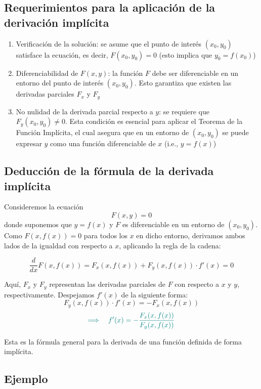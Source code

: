 \documentclass{article}
\begin{document}
\subsection*{Requerimientos para la aplicación de la derivación implícita}
\begin{enumerate}
    \item {\color{teal}Verificación de la solución:} se asume que el punto de interés \((x_0,y_0)\) satisface la ecuación, es decir, \(F(x_0,y_0) = 0\) (esto implica que \(y_0 = f(x_0)\))
    \item {\color{teal}Diferenciabilidad de \( F(x,y) \):} la función \( F \) debe ser diferenciable en un entorno del punto de interés \((x_0,y_0)\). Esto garantiza que existen las derivadas parciales \( F_x \) y \( F_y \)
    \item {\color{teal}No nulidad de la derivada parcial respecto a \( y \):} se requiere que \( F_y(x_0,y_0) \neq 0 \). Esta condición es esencial para aplicar el Teorema de la Función Implícita, el cual asegura que en un entorno de \((x_0,y_0)\) se puede expresar \( y \) como una función diferenciable de \( x \) (i.e., \( y = f(x) \))
\end{enumerate}

\subsection*{Deducción de la fórmula de la derivada implícita}

Consideremos la ecuación
\[
F(x,y) = 0
\]
donde suponemos que \( y = f(x) \) y \( F \) es diferenciable en un entorno de \((x_0,y_0)\). Como \( F(x,f(x)) = 0 \) para todos los \( x \) en dicho entorno, derivamos ambos lados de la igualdad con respecto a \( x \), aplicando la regla de la cadena:

\[
\frac{d}{dx}F(x,f(x)) = F_x(x,f(x)) + F_y(x,f(x)) \cdot f'(x) = 0
\]

Aquí, \( F_x \) y \( F_y \) representan las derivadas parciales de \( F \) con respecto a \( x \) y \( y \), respectivamente. Despejamos \( f'(x) \) de la siguiente forma:
\[
F_y(x,f(x)) \cdot f'(x) = -F_x(x,f(x))
\]
\[
\color{teal}
\Longrightarrow \quad f'(x) = -\frac{F_x(x,f(x))}{F_y(x,f(x))}
\]

Esta es la fórmula general para la derivada de una función definida de forma implícita.
\subsection*{Ejemplo}
\end{document}

